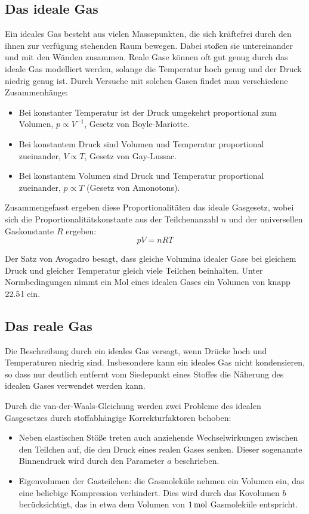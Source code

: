\documentclass[a4paper]{scrartcl}
\begin{document}
\subsection{Das ideale Gas}
Ein ideales Gas besteht aus vielen Massepunkten, die sich kräftefrei durch den ihnen zur verfügung stehenden Raum bewegen. Dabei stoßen sie untereinander und mit den Wänden zusammen. Reale Gase können oft gut genug durch das ideale Gas modelliert werden, solange die Temperatur hoch genug und der Druck niedrig genug ist. Durch Versuche mit solchen Gasen findet man verschiedene Zusammenhänge:
\begin{itemize}[noitemsep]
  \item Bei konstanter Temperatur ist der Druck umgekehrt proportional zum Volumen, $p \propto V^{-1}$, Gesetz von Boyle-Mariotte.
  \item Bei konstantem Druck sind Volumen und Temperatur proportional zueinander, $V \propto T$, Gesetz von Gay-Lussac.
  \item Bei konstantem Volumen sind Druck und Temperatur proportional zueinander, $p \propto T$ (Gesetz von Amonotons).
\end{itemize}
Zusammengefasst ergeben diese Proportionalitäten das ideale Gasgesetz, wobei sich die Proportionalitätskonstante aus der Teilchenanzahl $n$ und der universellen Gaskonstante $R$ ergeben:
\begin{equation*}
  pV = nRT
\end{equation*}

Der Satz von Avogadro besagt, dass gleiche Volumina idealer Gase bei gleichem Druck und gleicher Temperatur gleich viele Teilchen beinhalten. Unter Normbedingungen nimmt ein Mol eines idealen Gases ein Volumen von knapp $\unit[22.5]{l}$ ein.

\subsection{Das reale Gas}
Die Beschreibung durch ein ideales Gas versagt, wenn Drücke hoch und Temperaturen niedrig sind. Insbesondere kann ein ideales Gas nicht kondensieren, so dass nur deutlich entfernt vom Siedepunkt eines Stoffes die Näherung des idealen Gases verwendet werden kann.

Durch die van-der-Waals-Gleichung werden zwei Probleme des idealen Gasgesetzes durch stoffabhängige Korrekturfaktoren behoben:
\begin{itemize}[noitemsep]
  \item Neben elastischen Stöße treten auch anziehende Wechselwirkungen zwischen den Teilchen auf, die den Druck eines realen Gases senken. Dieser sogenannte Binnendruck wird durch den Parameter $a$ beschrieben.
  \item Eigenvolumen der Gasteilchen: die Gasmoleküle nehmen ein Volumen ein, das eine beliebige Kompression verhindert. Dies wird durch das Kovolumen $b$ berücksichtigt, das in etwa dem Volumen von $\unit[1]{mol}$ Gasmoleküle entspricht.
\end{itemize}
\end{document}
